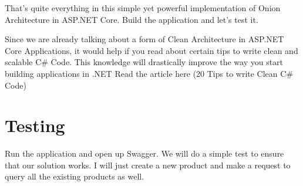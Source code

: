 \documentclass[letterpaper,10pt,english]{sphinxmanual}
\begin{document}
\begin{sphinxVerbatim}[commandchars=\\\{\}]
        
                
\PYG{n+na}{    [HttpPut(\PYGZdq{}[action]}\PYG{l+s}{\PYGZdq{})]}
          
           
             
          
\end{sphinxVerbatim}

That’s quite everything in this simple yet powerful implementation of Onion Architecture in ASP.NET Core. Build the application and let’s test it.

Since we are already talking about a form of Clean Architecture in ASP.NET Core Applications, it would help if you read about certain tips to write clean and scalable C\# Code. This knowledge will drastically improve the way you start building applications in .NET \textendash{} Read the article here (20 Tips to write Clean C\# Code)


\chapter{Testing}
\label{\detokenize{OnionArchitecture/details:testing}}
Run the application and open up Swagger. We will do a simple test to ensure that our solution works. I will just create a new product and make a request to query all the existing products as well.
\end{document}
